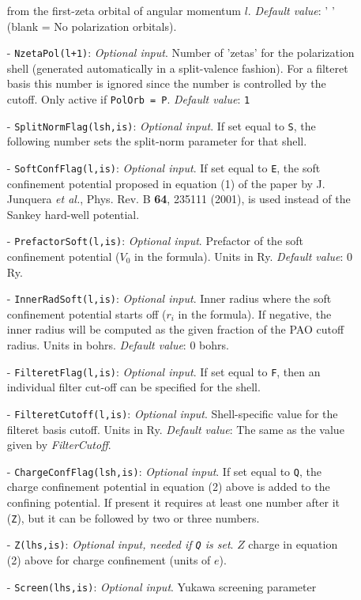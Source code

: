 \documentclass[11pt]{article}
\begin{document}
\begin{description}
\begin{itemize}
from the first-zeta orbital of angular momentum $l$. {\it Default value}: ' '
(blank = No polarization orbitals).
\item[-] {\tt NzetaPol(l+1)}: {\it Optional input}. Number of
'zetas' for the
polarization shell (generated automatically in a split-valence fashion).
For a filteret basis this number is ignored since the number is controlled
by the cutoff.
Only active if {\tt PolOrb = P}. {\it Default value}: {\tt 1}
\item[-] {\tt SplitNormFlag(lsh,is)}:
{\it Optional input}. If set equal to
{\tt S}, the following number sets the split-norm parameter for that shell.
\item[-] {\tt SoftConfFlag(l,is)}:
{\it Optional input}. If set equal to
{\tt E}, the soft confinement potential proposed in equation (1) of
the paper by J. Junquera {\it et al.}, Phys. Rev. B {\bf 64}, 235111 (2001),
is used instead of the Sankey hard-well potential.
\item[-] {\tt PrefactorSoft(l,is)}: {\it Optional input}. Prefactor
of the soft confinement potential ($V_{0}$ in the formula). Units in Ry.
{\it Default value}: 0 Ry.
\item[-] {\tt InnerRadSoft(l,is)}: {\it Optional input}. Inner radius where
the soft confinement potential starts off ($r_{i}$ in the formula).
If negative, the inner radius will be computed as the given fraction
of the PAO cutoff radius.
Units in bohrs. {\it Default value}: 0 bohrs.
\item[-] {\tt FilteretFlag(l,is)}:
{\it Optional input}. If set equal to
{\tt F}, then an individual filter cut-off can be specified for the shell.
\item[-] {\tt FilteretCutoff(l,is)}: {\it Optional input}. Shell-specific
value for the filteret basis cutoff. Units in Ry.
{\it Default value}: The same as the value given by {\it FilterCutoff}.
\item[-] {\tt ChargeConfFlag(lsh,is)}: {\it Optional input}. If set equal to 
{\tt Q}, the charge confinement potential in equation (2) above is
added to the confining potential. If present it requires at least
one number after it ({\tt Z}), but it can be followed by two or three numbers.
\item[-] {\tt Z(lhs,is)}: {\it Optional input, needed if {\tt Q} is set}. $Z$
charge in equation (2) above for charge confinement (units of $e$). 
\item[-] {\tt Screen(lhs,is)}: {\it Optional input}. Yukawa screening parameter

\end{itemize}
\end{description}
\end{document}
